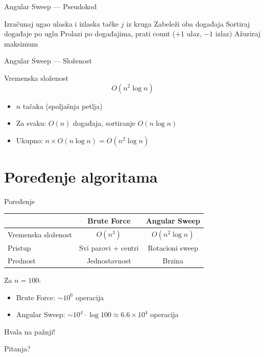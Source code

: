 \documentclass{beamer}
\begin{document}
\begin{frame}{Angular Sweep --- Pseudokod}
\begin{algorithmic}[1]
        \STATE Izračunaj ugao ulaska i izlaska tačke $j$ iz kruga
        \STATE Zabeleži oba događaja
    \ENDFOR
    \STATE Sortiraj događaje po uglu
    \STATE Prolazi po događajima, prati count ($+1$ ulaz, $-1$ izlaz)
    \STATE Ažuriraj maksimum
\ENDFOR
\end{algorithmic}
\end{frame}

\begin{frame}{Angular Sweep --- Složenost}
\begin{block}{Vremenska složenost}
\[
O(n^2 \log n)
\]
\begin{itemize}
    \item $n$ tačaka (spoljašnja petlja)
    \item Za svaku: $O(n)$ događaja, sortiranje $O(n \log n)$
    \item Ukupno: $n \times O(n \log n) = O(n^2 \log n)$
\end{itemize}
\end{block}
\end{frame}

\section{Poređenje algoritama}

\begin{frame}{Poređenje}
\begin{center}
\begin{tabular}{|l|c|c|}
\hline
 & \textbf{Brute Force} & \textbf{Angular Sweep} \\
\hline
Vremenska složenost & $O(n^3)$ & $O(n^2 \log n)$ \\
\hline
Pristup & Svi parovi + centri & Rotacioni sweep \\
\hline
Prednost & Jednostavnost & Brzina \\
\hline
\end{tabular}
\end{center}

\vspace{10pt}

Za $n = 100$:
\begin{itemize}
    \item Brute Force: $\sim 10^6$ operacija
    \item Angular Sweep: $\sim 10^4 \cdot \log 100 \approx 6.6 \times 10^4$ operacija
\end{itemize}
\end{frame}

\begin{frame}{}
\begin{center}
\Huge Hvala na pažnji!

\vspace{20pt}

\large Pitanja?
\end{center}
\end{frame}
\end{document}

